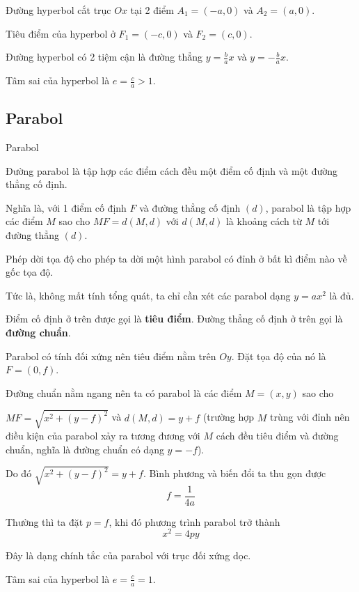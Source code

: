 Đường hyperbol cắt trục $Ox$ tại 2 điểm $A_1 = (-a, 0)$ và $A_2 = (a, 0)$.

Tiêu điểm của hyperbol ở $F_1 = (-c, 0)$ và $F_2 = (c, 0)$.

Đường hyperbol có 2 tiệm cận là đường thẳng $y = \frac{b}{a} x$ và $y = -\frac{b}{a} x$.

Tâm sai của hyperbol là $e = \frac{c}{a} > 1$.

\subsection{Parabol}

\begin{defblock}{Parabol}

    Đường parabol là tập hợp các điểm cách đều một điểm cố định và một đường thẳng cố định.

\end{defblock}

Nghĩa là, với 1 điểm cố định $F$ và đường thẳng cố định $(d)$, parabol là tập hợp các điểm $M$ sao cho $MF = d(M, d)$ với $d(M, d)$ là khoảng cách từ $M$ tới đường thẳng $(d)$.

Phép dời tọa độ cho phép ta dời một hình parabol có đỉnh ở bất kì điểm nào về gốc tọa độ.

Tức là, không mất tính tổng quát, ta chỉ cần xét các parabol dạng $y=ax^2$ là đủ.

Điểm cố định ở trên được gọi là \textbf{tiêu điểm}. Đường thẳng cố định ở trên gọi là \textbf{đường chuẩn}.

Parabol có tính đối xứng nên tiêu điểm nằm trên $Oy$. Đặt tọa độ của nó là $F = (0, f)$.

Đường chuẩn nằm ngang nên ta có parabol là các điểm $M = (x, y)$ sao cho

$MF = \sqrt{x^2 + (y-f)^2}$ và $d(M, d) = y+f$ 
(trường hợp $M$ trùng với đỉnh nên điều kiện của parabol xảy ra tương đương với $M$ cách đều tiêu điểm và đường chuẩn, nghĩa là đường chuẩn có dạng $y=-f$).

Do đó $\sqrt{x^2 + (y-f)^2} = y + f$. Bình phương và biến đổi ta thu gọn được
$$f = \frac{1}{4a}$$

Thường thì ta đặt $p = f$, khi đó phương trình parabol trở thành 
$$x^2 = 4py$$

Đây là dạng chính tắc của parabol với trục đối xứng dọc.

Tâm sai của hyperbol là $e = \frac{c}{a} = 1$.
\newpage